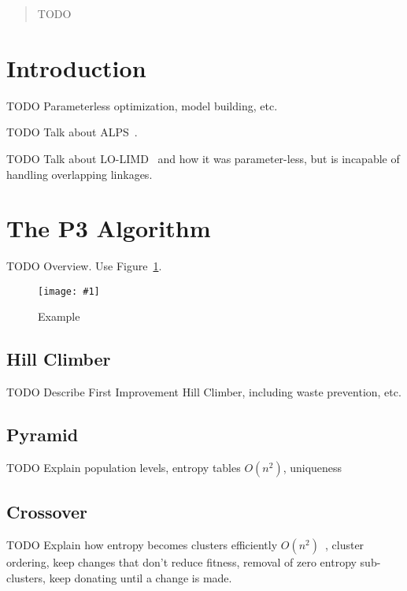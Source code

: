 \documentclass{sig-alternate}
\newcommand{\includegraphicsfit}[1]
{\texttt{[image: \#1]}}
\begin{document}
\maketitle
\begin{abstract}
TODO
\end{abstract}




\section{Introduction}
TODO Parameterless optimization, model building, etc.

TODO Talk about ALPS~\cite{hornby:2006:alps}.

TODO Talk about LO-LIMD~\cite{posik:2011:parameterless} and how it was parameter-less,
but is incapable of handling overlapping linkages.

\section{The P3 Algorithm}
TODO Overview.  Use Figure~\ref{fig-p3}.

\begin{figure}
  \centering
  \includegraphicsfit{P3_big_fail}
  \caption{Example}
  \label{fig-p3}
\end{figure}

\subsection{Hill Climber}
TODO Describe First Improvement Hill Climber, including waste prevention, etc.

\subsection{Pyramid}
TODO Explain population levels, entropy tables $O(n^2)$, uniqueness

\subsection{Crossover}
TODO Explain how entropy becomes clusters efficiently $O(n^2)$~\cite{gronau:2007:upgma}, cluster ordering,
keep changes that don't reduce fitness, removal of zero entropy sub-clusters,
keep donating until a change is made.
\end{document}
